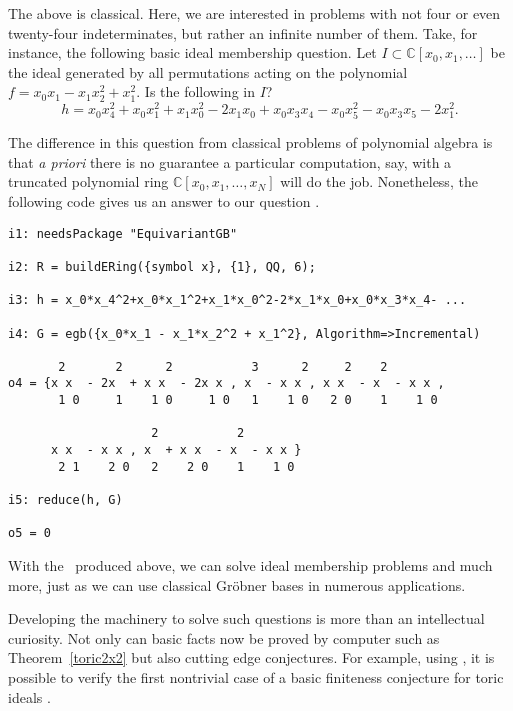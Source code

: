The above is classical.  Here, we are interested in problems with not four or even twenty-four indeterminates, but rather an infinite number of them.  Take, for instance, the following basic ideal membership question.  Let $I \subset \mathbb C[x_0,x_1,\ldots]$ be the ideal generated by all permutations acting on the polynomial $f = x_0 x_1 - x_1 x_2^2 +x_1^2$.  Is the following in $I$?
\[ h = x_0 x_4^2 + x_0 x_1^2  +x_1 x_0^2 - 2 x_1 x_0 + x_0 x_3 x_4 - x_0 x_5^2 - x_0 x_3 x_5 - 2 x_1^2.\]

The difference in this question from classical problems of polynomial algebra is that \textit{a priori} there is no guarantee a particular computation, say, with a truncated polynomial ring $\mathbb C[x_0,x_1,\ldots, x_N]$ will do the job.  Nonetheless, the following code gives us an answer to our question \cite{EquivariantGB}.
\begin{M2}
\begin{verbatim}
i1: needsPackage "EquivariantGB"

i2: R = buildERing({symbol x}, {1}, QQ, 6);

i3: h = x_0*x_4^2+x_0*x_1^2+x_1*x_0^2-2*x_1*x_0+x_0*x_3*x_4- ...

i4: G = egb({x_0*x_1 - x_1*x_2^2 + x_1^2}, Algorithm=>Incremental)

       2       2      2           3      2     2    2         
o4 = {x x  - 2x  + x x  - 2x x , x  - x x , x x  - x  - x x , 
       1 0     1    1 0     1 0   1    1 0   2 0    1    1 0 

                    2           2 
      x x  - x x , x  + x x  - x  - x x }
       2 1    2 0   2    2 0    1    1 0

i5: reduce(h, G)

o5 = 0
\end{verbatim}
\end{M2}  
With the \EGB\ produced above, we can solve ideal membership problems and much more, just as we can use classical Gr\"obner bases in numerous applications.  %

Developing the machinery to solve such questions is more than an intellectual curiosity.  Not only can basic facts now be proved by computer such as Theorem~\ref{toric2x2} but also cutting edge conjectures.  For example, using \cite{EquivariantGB}, it is possible to verify \cite{draisma2013noetherianity, Krone:egb-toric} the first nontrivial case of a basic finiteness conjecture for toric ideals \cite{aschenbrenner2007finite}.  

